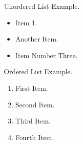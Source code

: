 \documentclass[a4paper]{article}
\begin{document}
Unordered List Example.
\begin{itemize}
    \item Item 1.
    \item Another Item.
    \item Item Number Three.
\end{itemize}


Ordered List Example.
\begin{enumerate}
    \item First Item.
    \item Second Item.
    \item Third Item.
    \item Fourth Item.
\end{enumerate}
\end{document}
